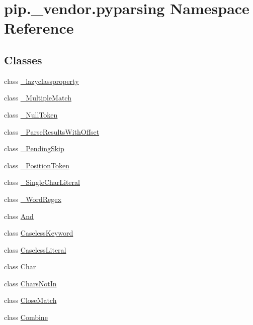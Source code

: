 \hypertarget{namespacepip_1_1__vendor_1_1pyparsing}{}\section{pip.\+\_\+vendor.\+pyparsing Namespace Reference}
\label{namespacepip_1_1__vendor_1_1pyparsing}
\subsection*{Classes}
\begin{DoxyCompactItemize}
\item 
class \hyperlink{classpip_1_1__vendor_1_1pyparsing_1_1__lazyclassproperty}{\+\_\+lazyclassproperty}
\item 
class \hyperlink{classpip_1_1__vendor_1_1pyparsing_1_1__MultipleMatch}{\+\_\+\+Multiple\+Match}
\item 
class \hyperlink{classpip_1_1__vendor_1_1pyparsing_1_1__NullToken}{\+\_\+\+Null\+Token}
\item 
class \hyperlink{classpip_1_1__vendor_1_1pyparsing_1_1__ParseResultsWithOffset}{\+\_\+\+Parse\+Results\+With\+Offset}
\item 
class \hyperlink{classpip_1_1__vendor_1_1pyparsing_1_1__PendingSkip}{\+\_\+\+Pending\+Skip}
\item 
class \hyperlink{classpip_1_1__vendor_1_1pyparsing_1_1__PositionToken}{\+\_\+\+Position\+Token}
\item 
class \hyperlink{classpip_1_1__vendor_1_1pyparsing_1_1__SingleCharLiteral}{\+\_\+\+Single\+Char\+Literal}
\item 
class \hyperlink{classpip_1_1__vendor_1_1pyparsing_1_1__WordRegex}{\+\_\+\+Word\+Regex}
\item 
class \hyperlink{classpip_1_1__vendor_1_1pyparsing_1_1And}{And}
\item 
class \hyperlink{classpip_1_1__vendor_1_1pyparsing_1_1CaselessKeyword}{Caseless\+Keyword}
\item 
class \hyperlink{classpip_1_1__vendor_1_1pyparsing_1_1CaselessLiteral}{Caseless\+Literal}
\item 
class \hyperlink{classpip_1_1__vendor_1_1pyparsing_1_1Char}{Char}
\item 
class \hyperlink{classpip_1_1__vendor_1_1pyparsing_1_1CharsNotIn}{Chars\+Not\+In}
\item 
class \hyperlink{classpip_1_1__vendor_1_1pyparsing_1_1CloseMatch}{Close\+Match}
\item 
class \hyperlink{classpip_1_1__vendor_1_1pyparsing_1_1Combine}{Combine}

\end{DoxyCompactItemize}
